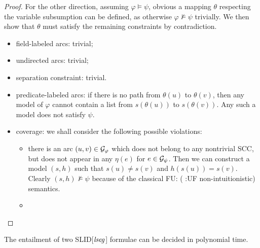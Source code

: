 \documentclass{llncs}
\newcommand{\fu}[1]{\color{purple} {FU: #1 :UF} \color{black}}
\begin{document}
\begin{proof}

 \medskip

For the other direction, assuming $\varphi\models \psi$, obvious a mapping $\theta$ respecting the variable subsumption can be defined, as otherwise $\varphi\not\models \psi$ trivially. We then show that $\theta$ must satisfy the remaining constraints by contradiction.

\begin{itemize}
\item field-labeled arcs: trivial;
\item undirected arcs: trivial;
\item separation constraint: trivial.
\item predicate-labeled arcs: if there is no path from $\theta(u)$ to $\theta(v)$, then any model of $\varphi$ cannot contain a list from $s(\theta(u))$ to $s(\theta(v))$. Any such a model does not satisfy $\psi$.

\item coverage:  we shall consider the following possible violations:
\begin{itemize}
\item there is an arc  $(u,v)\in \mathcal{G}_\varphi$ which does not belong to any nontrivial SCC, but does not appear in any $\eta(e)$ for $e\in \mathcal{G}_\psi$.  Then we can construct a model $(s,h)$ such that $s(u)\neq s(v)$ and $h(s(u))=s(v)$. Clearly $(s,h)\not\models \psi$ because of the classical \fu(non-intuitionistic) semantics.

\item
\end{itemize}
\end{itemize}





\end{proof}

\begin{theorem}
The entailment of two SLID[$\mathit{lseg}$] formulae can be decided in polynomial time.
\end{theorem}
\end{document}
